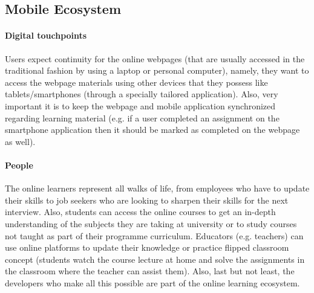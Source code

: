 \documentclass[11]{article}
\begin{document}
\subsection{Mobile Ecosystem}
	\paragraph{Digital touchpoints\\}
\indent
Users expect continuity for the online webpages (that are usually accessed in the traditional fashion by using a laptop or personal computer), namely, they want to access the webpage materials  using other devices that they possess like tablets/smartphones (through a specially tailored application). Also, very important it is to keep the webpage and mobile application synchronized regarding learning material (e.g. if a user completed an assignment on the smartphone application then it should be marked as completed on the webpage as well).\\

	\paragraph{People\\}
\indent
	The online learners represent all walks of life, from employees who have to update their skills to job seekers who are looking to sharpen their skills for the next interview. Also, students can access the online courses to get an in-depth understanding of the subjects  they are taking at university or to study courses not taught as part of their programme curriculum. Educators (e.g. teachers) can use online platforms to update their knowledge or practice flipped classroom concept (students watch the course lecture  at home and solve the assignments in the classroom where the teacher can assist them). Also, last but not least, the developers who make all this possible are part of the online learning ecosystem.\\
\end{document}

